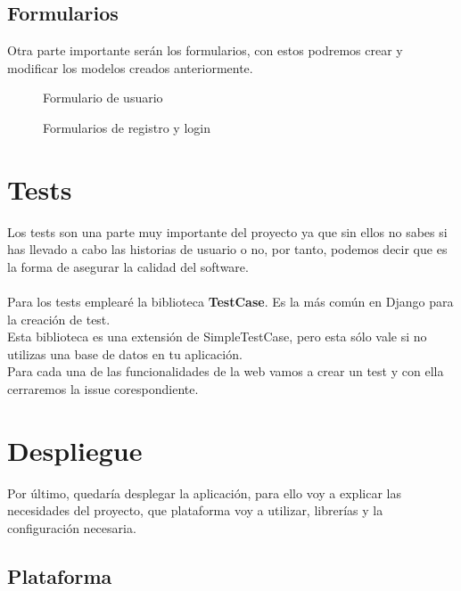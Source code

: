 \subsection{Formularios}

Otra parte importante serán los formularios, con estos podremos crear y modificar los modelos creados anteriormente.

\begin{figure}[H]
  \centering
  \noindent{}
  \caption{Formulario de usuario}
\end{figure}

\begin{figure}[H]
  \centering
  \noindent{}
  \caption{Formularios de registro y login}
\end{figure}

\newpage
\section{Tests} \label{sec:tests}

Los tests son una parte muy importante del proyecto ya que sin ellos no sabes si has llevado a cabo las historias de usuario o no, por tanto, 
podemos decir que es la forma de asegurar la calidad del software. \\ \\

Para los tests emplearé la biblioteca \textbf{TestCase}. Es la más común en Django para la creación de test.\\
Esta biblioteca es una extensión de SimpleTestCase, pero esta sólo vale si no utilizas una base de datos 
en tu aplicación.\\

Para cada una de las funcionalidades de la web vamos a crear un test y con ella cerraremos la issue corespondiente.

\section{Despliegue} \label{sec:despliegue}

Por último, quedaría desplegar la aplicación, para ello voy a explicar las necesidades del proyecto, que plataforma voy a utilizar, librerías y la configuración necesaria.\\

\subsection{Plataforma}

